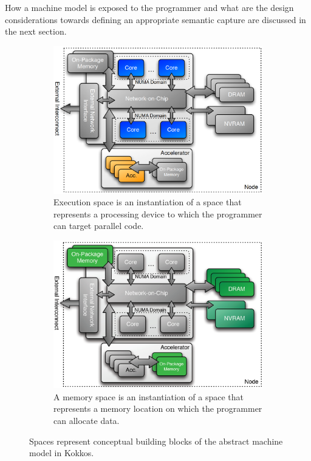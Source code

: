 How a machine model is exposed to the programmer and what are the design considerations towards defining an appropriate semantic capture are discussed in the next section.



\begin{figure}
\begin{subfigure}[b]{0.45\textwidth}
\centering
\includegraphics[width=\textwidth]{img/ExecSpaces.png}
\caption{Execution space is an instantiation of a space that represents a processing device to which the programmer can target parallel code.}
\label{fig:execspace}
\end{subfigure}%
\hfill \break
\begin{subfigure}[b]{0.45\textwidth}

\centering
\includegraphics[width=\textwidth]{img/MemSpaces.png}
\caption{A memory space is an instantiation of a space that represents a memory location on which the programmer can allocate data.}
\label{fig:memspace}
\end{subfigure}%
\caption{Spaces represent conceptual building blocks of the abstract machine model in Kokkos.}
\label{fig:spaces}
\end{figure}

